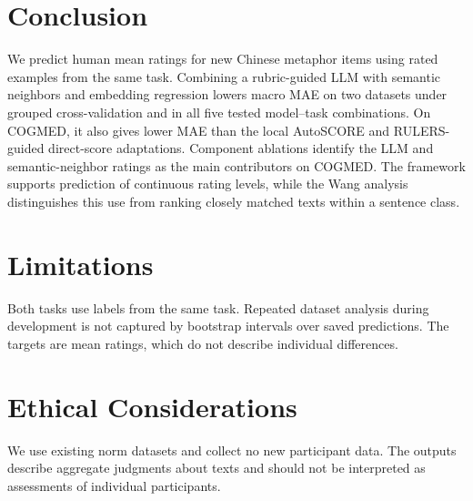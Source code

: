 \section{Conclusion}

We predict human mean ratings for new Chinese metaphor items using rated examples from the same task. Combining a rubric-guided LLM with semantic neighbors and embedding regression lowers macro MAE on two datasets under grouped cross-validation and in all five tested model--task combinations. On COGMED, it also gives lower MAE than the local AutoSCORE and RULERS-guided direct-score adaptations. Component ablations identify the LLM and semantic-neighbor ratings as the main contributors on COGMED. The framework supports prediction of continuous rating levels, while the Wang analysis distinguishes this use from ranking closely matched texts within a sentence class.

\newpage
\section*{Limitations}

Both tasks use labels from the same task. Repeated dataset analysis during development is not captured by bootstrap intervals over saved predictions. The targets are mean ratings, which do not describe individual differences.

\section*{Ethical Considerations}

We use existing norm datasets and collect no new participant data. The outputs describe aggregate judgments about texts and should not be interpreted as assessments of individual participants.